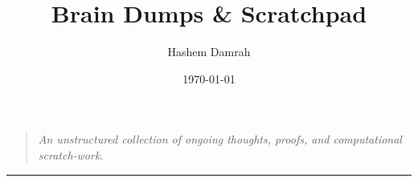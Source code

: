 \documentclass[11pt, letterpaper]{article}
\title{\vspace{-4em}\textbf{Brain Dumps \& Scratchpad}\vspace{-1em}}
\author{Hashem Damrah}
\date{\today}
\theoremstyle{definition}
\theoremstyle{remark}
\begin{document}
  \maketitle

  \begin{quote}
      \itshape An unstructured collection of ongoing thoughts, proofs, and computational scratch-work.
  \end{quote}

  \tableofcontents
  \vspace{2em}
  \hrule
  \vspace{2em}

\end{document}
